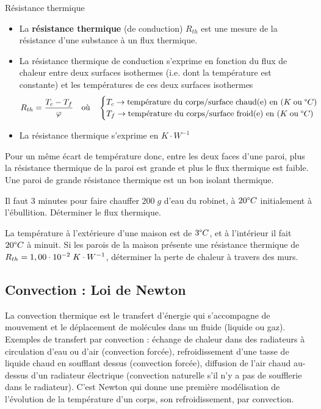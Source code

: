 \documentclass[11pt,a4paper]{article}
\begin{document}
\begin{defn}{Résistance thermique}
\begin{itemize}
    \item La \textbf{résistance thermique} (de conduction) $R_{th}$   est une mesure de la résistance d’une substance à un flux thermique. 
    \item La résistance thermique de conduction s'exprime en fonction du flux de chaleur entre deux surfaces isothermes (i.e. dont la température est constante) et les températures de ces deux surfaces isothermes 
    \[ R_{th} = \dfrac{T_c - T_f}{\varphi}      
    \quad \text{où} \quad 
    \begin{cases}
    T_c \rightarrow \text{température du corps/surface chaud(e) en }(K \;\text{ou}\;\degree C) \\
    T_f \rightarrow \text{température du corps/surface froid(e) en }(K \;\text{ou}\;\degree C) \\
    \end{cases}
    \]
    \item La résistance thermique s’exprime en $K\cdot W^{-1}$
\end{itemize}
\end{defn}    

Pour un même écart de température donc, entre les deux faces d’une paroi, plus la résistance thermique de la paroi est grande et plus le flux thermique est faible. Une paroi de grande résistance thermique est un bon isolant thermique.
\newpage
\begin{exo}
Il faut 3 minutes pour faire chauffer $200\; g $ d'eau du robinet, à $20\degree C$ initialement à l'ébullition. Déterminer le flux thermique.

\vspace{5cm}
\end{exo}

\begin{exo}
La température à l'extérieure d'une maison est de $3\degree C$, et à l'intérieur il fait $20\degree C$ à minuit. Si les parois de la maison présente une résistance thermique de $R_{th} = 1,00\cdot10^{-2}\; K\cdot W^{-1}$, déterminer la perte de chaleur à travers des murs. 
\vspace{5cm}
\end{exo}	
	
\subsection{Convection : Loi de Newton}
La convection thermique est le  transfert d'énergie qui s'accompagne de mouvement et le déplacement de molécules dans un fluide (liquide ou gaz). Exemples de transfert par convection : échange de chaleur dans des radiateurs à circulation d'eau ou d'air (convection forcée), refroidissement d'une tasse de liquide chaud en soufflant dessus (convection forcée), diffusion de l'air chaud au-dessus d'un radiateur électrique (convection naturelle s'il n'y a pas de soufflerie dans le radiateur). C'est Newton qui donne une première modélisation de l'évolution de la température d'un corps, son refroidissement, par convection. 
\end{document}
